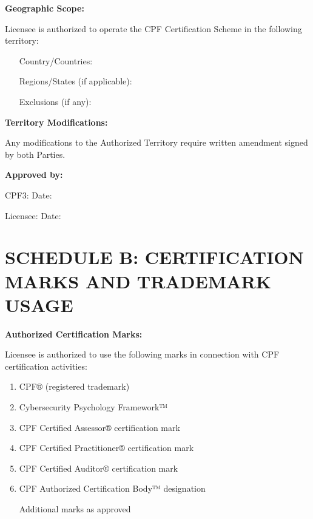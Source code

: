 \documentclass[11pt,a4paper]{article}
\begin{document}
\textbf{Geographic Scope:}

Licensee is authorized to operate the CPF Certification Scheme in the following territory:

\begin{itemize}
\item[] Country/Countries: \underline{\hspace{10cm}}
\item[] \underline{\hspace{12cm}}
\item[] Regions/States (if applicable): \underline{\hspace{8cm}}
\item[] \underline{\hspace{12cm}}
\item[] Exclusions (if any): \underline{\hspace{10cm}}
\item[] \underline{\hspace{12cm}}
\end{itemize}

\textbf{Territory Modifications:}

Any modifications to the Authorized Territory require written amendment signed by both Parties.

\vspace{2em}

\textbf{Approved by:}

\vspace{1em}

CPF3: \underline{\hspace{5cm}} Date: \underline{\hspace{3cm}}

Licensee: \underline{\hspace{5cm}} Date: \underline{\hspace{3cm}}

\newpage

\section*{SCHEDULE B: CERTIFICATION MARKS AND TRADEMARK USAGE}

\textbf{Authorized Certification Marks:}

Licensee is authorized to use the following marks in connection with CPF certification activities:

\begin{enumerate}
\item CPF® (registered trademark)
\item Cybersecurity Psychology Framework™
\item CPF Certified Assessor® certification mark
\item CPF Certified Practitioner® certification mark
\item CPF Certified Auditor® certification mark
\item CPF Authorized Certification Body™ designation
\item [Additional marks as approved]
\end{enumerate}
\end{document}
